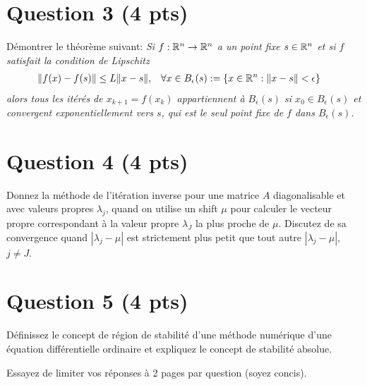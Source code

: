\section*{Question 3 (4 pts)}
Démontrer le théorème suivant:
\textit{
  Si $f: \mathbb{R}^n \to \mathbb{R}^n$ a un point fixe $s \in \mathbb{R}^n$ et si $f$ satisfait
  la condition de Lipschitz
  \begin{align*}
    \|f(x) - f(s)\| & \leq L\|x-s\|, &
    \forall x \in B_\epsilon(s) & := \{x \in \mathbb{R}^n : \|x - s\| < \epsilon\}
  \end{align*}
  alors tous les itérés de $x_{k+1} = f(x_k)$ appartiennent à $B_\epsilon(s)$
  si $x_0 \in B_\epsilon(s)$ et convergent exponentiellement vers $s$,
  qui est le seul point fixe de $f$ dans $B_\epsilon(s)$.
}

\begin{solution}
\end{solution}

\section*{Question 4 (4 pts)}
Donnez la méthode de l'itération inverse pour une matrice $A$
diagonalisable et avec valeurs propres $\lambda_j$,
quand on utilise un shift $\mu$ pour calculer le vecteur propre
correspondant à la valeur propre $\lambda_J$ la plus proche de $\mu$.
Discutez de sa convergence quand $|\lambda_j - \mu|$ est
strictement plus petit que tout autre $|\lambda_j - \mu|$, $j \neq J$.

\begin{solution}
\end{solution}

\section*{Question 5 (4 pts)}
Définissez le concept de région de stabilité d'une méthode numérique
d'une équation différentielle ordinaire et expliquez le concept de
stabilité absolue.

\begin{solution}
\end{solution}

Essayez de limiter vos réponses à 2 pages par question (soyez concis).


